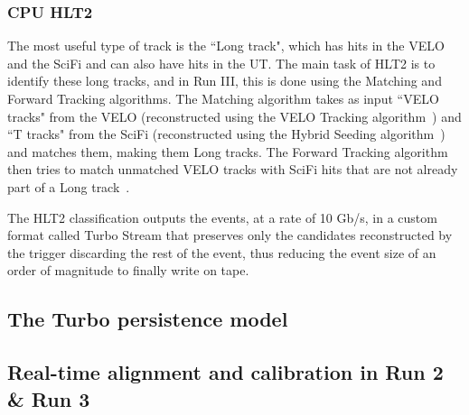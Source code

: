 \subsubsection{CPU HLT2}

The most useful type of track is the ``Long track", which has hits in the VELO and the SciFi and can also have hits in the UT. The main task of HLT2 is to identify these long tracks, and in Run III, this is done using the Matching and Forward Tracking algorithms. The Matching algorithm takes as input ``VELO tracks" from the VELO (reconstructed using the VELO Tracking algorithm~\cite{LHCb_VELO_tracker}) and ``T tracks" from the SciFi (reconstructed using the Hybrid Seeding algorithm~\cite{LHCb_HybridSeeding}) and matches them, making them Long tracks. The Forward Tracking algorithm then tries to match unmatched VELO tracks with SciFi hits that are not already part of a Long track~\cite{LHCb_HLT2}. 

The HLT2 classification outputs the events, at a rate of 10 Gb/s, in a custom format called Turbo Stream that preserves only the candidates reconstructed by the trigger discarding the rest of the event, thus reducing the event size of an order of magnitude to finally write on tape.


\subsection{The Turbo persistence model} %


 


\subsection {Real-time alignment and calibration in Run 2 \& Run 3}%



